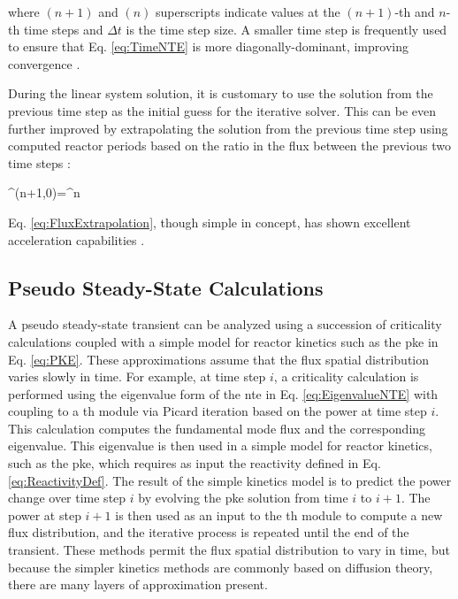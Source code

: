 where \((n+1)\) and \((n)\) superscripts indicate values at the \((n+1)\)-th and \(n\)-th time steps and \(\Delta t\) is the time step size. A smaller time step is frequently used to ensure that Eq. \eqref{eq:TimeNTE} is more diagonally-dominant, improving convergence \cite{tyobeka}.

During the linear system solution, it is customary to use the solution from the previous time step as the initial guess for the iterative solver. This can be even further improved by extrapolating the solution from the previous time step using computed reactor periods based on the ratio in the flux between the previous two time steps \cite{pautz}:

\beq
\label{eq:FluxExtrapolation}
\psi^{(n+1,0)}=\psi^{n}
\eeq

Eq. \eqref{eq:FluxExtrapolation}, though simple in concept, has shown excellent acceleration capabilities \cite{tyobeka}.

\subsection{Pseudo Steady-State Calculations}
\label{sec:PseudoSteadyState}

A pseudo steady-state transient can be analyzed using a succession of criticality calculations coupled with a simple model for reactor kinetics such as the \gls{pke} in Eq. \eqref{eq:PKE}. These approximations assume that the flux spatial distribution varies slowly in time. For example, at time step \(i\), a criticality calculation is performed using the eigenvalue form of the \gls{nte} in Eq. \eqref{eq:EigenvalueNTE} with coupling to a \gls{th} module via Picard iteration based on the power at time step \(i\). This calculation computes the fundamental mode flux and the corresponding eigenvalue. This eigenvalue is then used in a simple model for reactor kinetics, such as the \gls{pke}, which requires as input the reactivity defined in Eq. \eqref{eq:ReactivityDef}. The result of the simple kinetics model is to predict the power change over time step \(i\) by evolving the \gls{pke} solution from time \(i\) to \(i+1\). The power at step \(i+1\) is then used as an input to the \gls{th} module to compute a new flux distribution, and the iterative process is repeated until the end of the transient. These methods permit the flux spatial distribution to vary in time, but because the simpler kinetics methods are commonly based on diffusion theory, there are many layers of approximation present. 

